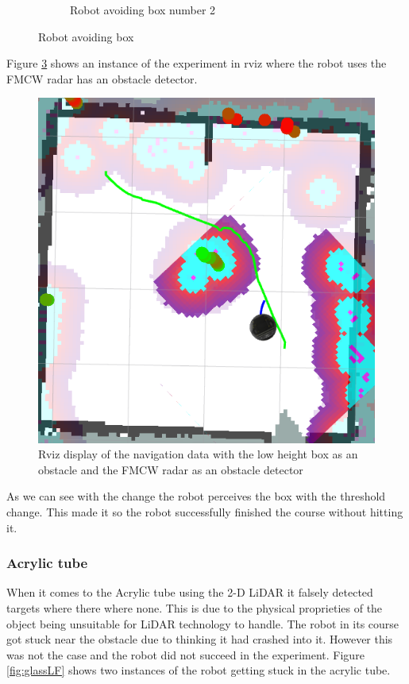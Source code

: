 \begin{figure}[ht!]
\begin{subfigure}[b]{0.47\linewidth}
    \caption{Robot avoiding box  number 2}
    \label{fig::boxRS2}
  \end{subfigure}
  \caption{Robot avoiding box}
  \label{fig:boxRS}
\end{figure}
Figure \ref{fig:rvizboxradar} shows an instance of the experiment in rviz where the robot uses the \ac{FMCW} \ac{radar} has an obstacle detector.
\begin{figure}[ht!]
\centerline{\includegraphics [width=0.5 \textwidth]{imgs/chapter5/rvizboxradar.png}}
\caption[Navigation data with box as an obstacle and with the \ac{FMCW} \ac{radar}]{Rviz display of the navigation data with the low height box as an obstacle and the \ac{FMCW} \ac{radar} as an obstacle detector}
\label{fig:rvizboxradar}
\end{figure}
As we can see  with the change the robot perceives the box with the threshold change. This made it so the robot successfully finished the course without hitting it.
\subsubsection{Acrylic tube}


When it comes to the Acrylic tube using the 2-D \ac{LiDAR} it falsely detected targets where there where none. This is due to the physical proprieties of the object being unsuitable for \ac{LiDAR} technology to handle. The robot in its course got stuck near the obstacle due to thinking it had crashed into it. However this was not the case and the robot did not succeed in the experiment. Figure \ref{fig:glassLF} shows two instances of the robot getting stuck in the acrylic tube.

